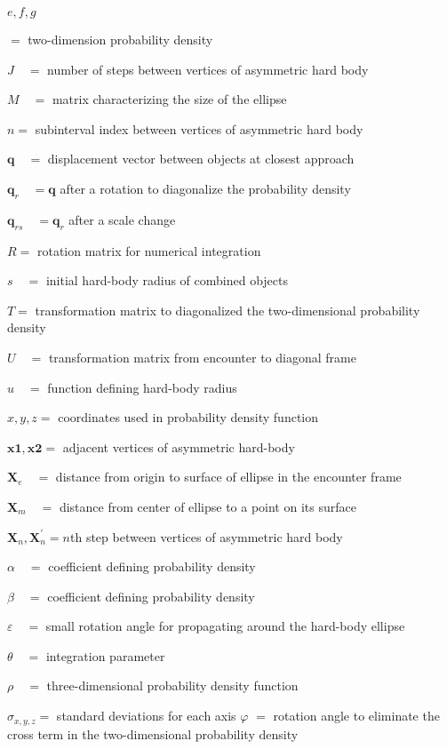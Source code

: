 \documentclass[10pt]{article}
\begin{document}
$e, f, g$

$=$ two-dimension probability density

$J \quad=$ number of steps between vertices of asymmetric hard body

$M \quad=$ matrix characterizing the size of the ellipse

$n=$ subinterval index between vertices of asymmetric hard body

$\boldsymbol{q} \quad=$ displacement vector between objects at closest approach

$\boldsymbol{q}_{r} \quad=\boldsymbol{q}$ after a rotation to diagonalize the probability density

$\boldsymbol{q}_{r s} \quad=\boldsymbol{q}_{r}$ after a scale change

$R=$ rotation matrix for numerical integration

$s \quad=$ initial hard-body radius of combined objects

$T=$ transformation matrix to diagonalized the two-dimensional probability density

$U \quad=$ transformation matrix from encounter to diagonal frame

$u \quad=$ function defining hard-body radius

$x, y, z=$ coordinates used in probability density function

$\boldsymbol{x} \mathbf{1}, \boldsymbol{x} \mathbf{2}=$ adjacent vertices of asymmetric hard-body

$\boldsymbol{X}_{e} \quad=$ distance from origin to surface of ellipse in the encounter frame

$\boldsymbol{X}_{m} \quad=$ distance from center of ellipse to a point on its surface

$\boldsymbol{X}_{n}, \boldsymbol{X}_{n}^{\prime}=n$th step between vertices of asymmetric hard body

$\alpha \quad=$ coefficient defining probability density

$\beta \quad=$ coefficient defining probability density

$\varepsilon \quad=$ small rotation angle for propagating around the hard-body ellipse

$\theta \quad=$ integration parameter

$\rho \quad=$ three-dimensional probability density function

$\sigma_{x, y, z}=$ standard deviations for each axis $\varphi$ $=$ rotation angle to eliminate the cross term in the two-dimensional probability density
\end{document}
